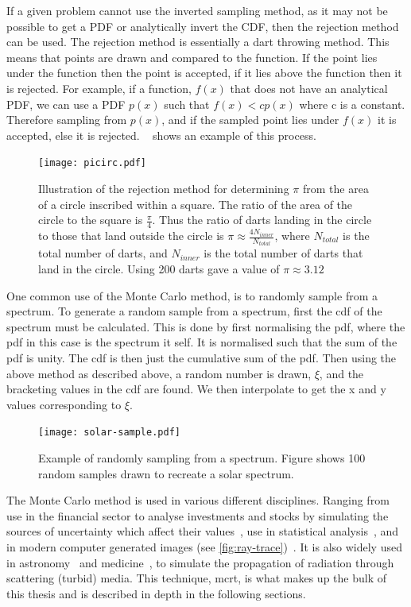 \medskip

If a given problem cannot use the inverted sampling method, as it may not be possible to get a PDF or analytically invert the CDF, then the rejection method can be used.
The rejection method is essentially a dart throwing method.
This means that points are drawn and compared to the function.
If the point lies under the function then the point is accepted, if it lies above the function then it is rejected.
For example, if a function, $f(x)$ that does not have an analytical PDF, we can use a PDF $p(x)$ such that $f(x) < cp(x)$ where c is a constant.
Therefore sampling from $p(x)$, and if the sampled point lies under $f(x)$ it is accepted, else it is rejected.
~ shows an example of this process.

\begin{figure}[!ht]
    \centering
    \texttt{[image: picirc.pdf]}
    \caption{Illustration of the rejection method for determining $\pi$ from the area of a circle inscribed within a square. The ratio of the area of the circle to the square is $\tfrac{\pi}{4}$. Thus the ratio of darts landing in the circle to those that land outside the circle is $\pi \approx \tfrac{4N_{inner}}{N_{total}}$, where $N_{total}$ is the total number of darts, and $N_{inner}$ is the total number of darts that land in the circle. Using 200 darts gave a value of $\pi \approx 3.12$}
    \label{fig:picircle}
\end{figure}


One common use of the Monte Carlo method, is to randomly sample from a spectrum.
To generate a random sample from a spectrum, first the \gls*{cdf} of the spectrum must be calculated.
This is done by first normalising the \gls*{pdf}, where the pdf in this case is the spectrum it self.
It is normalised such that the sum of the \gls*{pdf} is unity.
The \gls*{cdf} is then just the cumulative sum of the \gls*{pdf}.
Then using the above method as described above, a random number is drawn, $\xi$, and the bracketing values in the \gls*{cdf} are found.
We then interpolate to get the x and y values corresponding to $\xi$.

\begin{figure}[!htbp]
    \centering
    \texttt{[image: solar-sample.pdf]}
    \caption{Example of randomly sampling from a spectrum. Figure shows 100 random samples drawn to recreate a solar spectrum.}
    \label{fig:solar}
\end{figure}

The Monte Carlo method is used in various different disciplines. Ranging from use in the financial sector to analyse investments and stocks by simulating the sources of uncertainty which affect their values~\cite{jackel2002monte,finaceprrof}, use in statistical analysis~\cite{wall2012practical}, and in modern computer generated images (see \cref{fig:ray-trace})~\cite{Kajiyarendering,Cookraytracing}. It is also widely used in astronomy~\cite{robitaille2011hyperion,harries2014torus} and medicine~\cite{valentine2011monte,campbell2015monte}, to simulate the propagation of radiation through scattering (turbid) media. This technique, \gls*{mcrt}, is what makes up the bulk of this thesis and is described in depth in the following sections.

